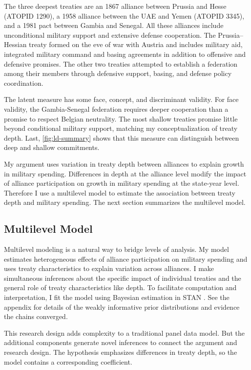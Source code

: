 \documentclass[12pt]{article}
\begin{document}
The three deepest treaties are an 1867 alliance between Prussia and Hesse (ATOPID 1290), a 1958 alliance between the UAE and Yemen (ATOPID 3345), and a 1981 pact between Gambia and Senegal. 
All these alliances include unconditional military support and extensive defense cooperation. 
The Prussia--Hessian treaty formed on the eve of war with Austria and includes military aid, integrated military command and basing agreements in addition to offensive and defensive promises. 
The other two treaties attempted to establish a federation among their members through defensive support, basing, and defense policy coordination. 


The latent measure has some face, concept, and discriminant validity. 
For face validity, the Gambia-Senegal federation requires deeper cooperation than a promise to respect Belgian neutrality. 
The most shallow treaties promise little beyond conditional military support, matching my conceptualization of treaty depth. 
Last, \autoref{fig:ld-summary} shows that this measure can distinguish between deep and shallow commitments. 


My argument uses variation in treaty depth between alliances to explain growth in military spending.
Differences in depth at the alliance level modify the impact of alliance participation on growth in military spending at the state-year level. 
Therefore I use a multilevel model to estimate the association between treaty depth and military spending.  
The next section summarizes the multilevel model. 


\subsection{Multilevel Model} 


Multilevel modeling is a natural way to bridge levels of analysis.
My model estimates heterogeneous effects of alliance participation on military spending and uses treaty characteristics to explain variation across alliances. 
I make simultaneous inferences about the specific impact of individual treaties and the general role of treaty characteristics like depth. 
To facilitate computation and interpretation, I fit the model using Bayesian estimation in STAN \citep{Carpenteretal2016}. 
See the appendix for details of the weakly informative prior distributions and evidence the chains converged.


This research design adds complexity to a traditional panel data model. 
But the additional components generate novel inferences to connect the argument and research design. 
The hypothesis emphasizes differences in treaty depth, so the model contains a corresponding coefficient.
\end{document}
